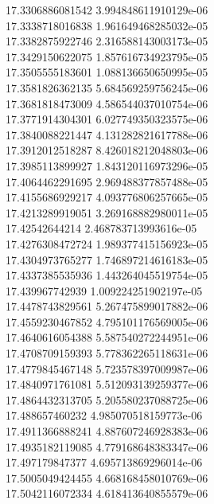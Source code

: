 {17.3306886081542 3.994848611910129e-06
 \\
17.3338718016838 1.961649468285032e-05
 \\
17.3382875922746 2.316588143003173e-05
 \\
17.3429150622075 1.857616734923795e-05
 \\
17.3505555183601 1.088136650650995e-05
 \\
17.3581826362135 5.684569259756245e-06
 \\
17.3681818473009 4.586544037010754e-06
 \\
17.3771914304301 6.027749350323575e-06
 \\
17.3840088221447 4.131282821617788e-06
 \\
17.3912012518287 8.426018212048803e-06
 \\
17.3985113899927 1.843120116973296e-05
 \\
17.4064462291695 2.969488377857488e-05
 \\
17.4155686929217 4.093776806257665e-05
 \\
17.4213289919051 3.269168882980011e-05
 \\
17.42542644214 2.468783713993616e-05
 \\
17.4276308472724 1.989377415156923e-05
 \\
17.4304973765277 1.746897214616183e-05
 \\
17.4337385535936 1.443264045519754e-05
 \\
17.439967742939 1.009224251902197e-05
 \\
17.4478743829561 5.267475899017882e-06
 \\
17.4559230467852 4.795101176569005e-06
 \\
17.4640616054388 5.587540272244951e-06
 \\
17.4708709159393 5.778362265118631e-06
 \\
17.4779845467148 5.723578397009987e-06
 \\
17.4840971761081 5.512093139259377e-06
 \\
17.4864432313705 5.205580237088725e-06
 \\
17.488657460232 4.985070518159773e-06
 \\
17.4911366888241 4.887607246928383e-06
 \\
17.4935182119085 4.779168648383347e-06
 \\
17.497179847377 4.695713869296014e-06
 \\
17.5005049424455 4.668168458010769e-06
 \\
17.5042116072334 4.618413640855579e-06
}
